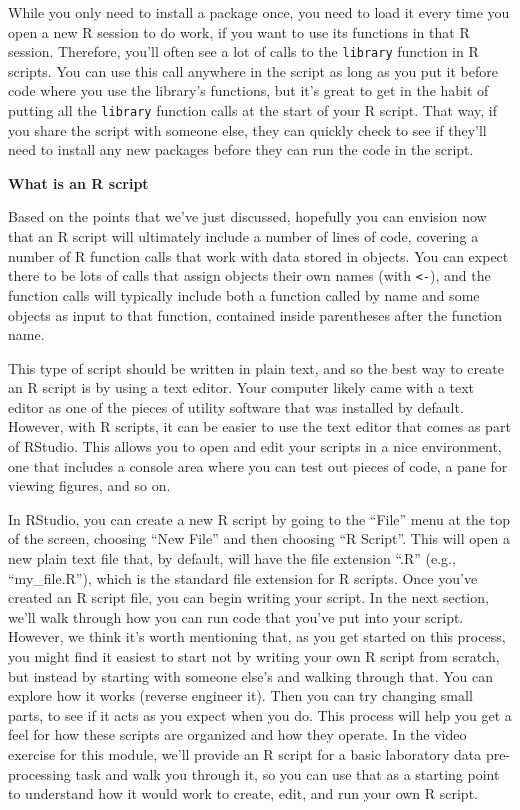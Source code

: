 \documentclass[]{tufte-book}
\begin{document}
While you only need to install a package once, you need to load it every
time you open a new R session to do work, if you want to use its functions in
that R session. Therefore, you'll often see a lot of calls to the \texttt{library}
function in R scripts. You can use this call anywhere in the script as long as
you put it before code where you use the library's functions, but it's great to
get in the habit of putting all the \texttt{library} function calls at the start of
your R script. That way, if you share the script with someone else, they can
quickly check to see if they'll need to install any new packages before they can
run the code in the script.

\textbf{What is an R script}

Based on the points that we've just discussed, hopefully you can envision now
that an R script will ultimately include a number of lines of code, covering a
number of R function calls that work with data stored in objects. You can expect
there to be lots of calls that assign objects their own names (with \texttt{\textless{}-}), and
the function calls will typically include both a function called by name and
some objects as input to that function, contained inside parentheses after the
function name.

This type of script should be written in plain text, and so the best way to
create an R script is by using a text editor. Your computer likely came with a
text editor as one of the pieces of utility software that was installed by
default. However, with R scripts, it can be easier to use the text editor that
comes as part of RStudio. This allows you to open and edit your scripts in a
nice environment, one that includes a console area where you can test out pieces
of code, a pane for viewing figures, and so on.

In RStudio, you can create a new R script by going to the ``File'' menu at the top
of the screen, choosing ``New File'' and then choosing ``R Script''. This will open
a new plain text file that, by default, will have the file extension ``.R'' (e.g.,
``my\_file.R''), which is the standard file extension for R scripts. Once you've
created an R script file, you can begin writing your script. In the next
section, we'll walk through how you can run code that you've put into your
script. However, we think it's worth mentioning that, as you get started on this
process, you might find it easiest to start not by writing your own R script
from scratch, but instead by starting with someone else's and walking through
that. You can explore how it works (reverse engineer it). Then you can try
changing small parts, to see if it acts as you expect when you do. This process
will help you get a feel for how these scripts are organized and how they
operate. In the video exercise for this module, we'll provide an R script for a
basic laboratory data pre-processing task and walk you through it, so you can use
that as a starting point to understand how it would work to create, edit, and
run your own R script.
\end{document}
